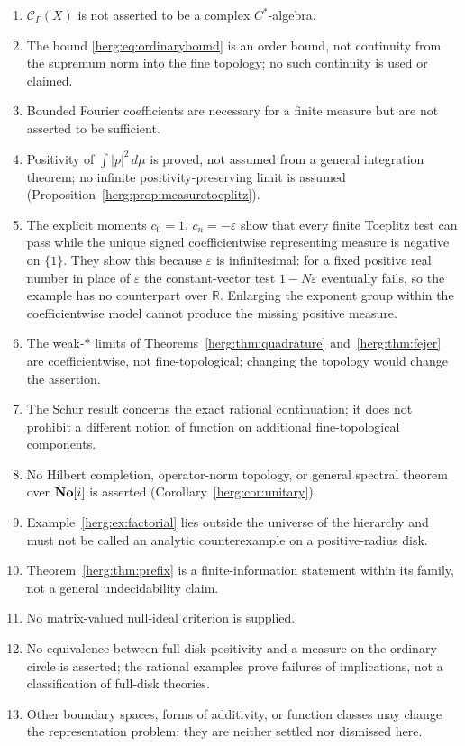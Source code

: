 \documentclass[11pt,letterpaper]{article}
\theoremstyle{definition}
\newcommand{\R}{\mathbb R}\newcommand{\C}{\mathbb C}
\newcommand{\CH}{\mathscr C_\Gamma}
\newcommand{\eps}{\varepsilon}
\newcommand{\dd}{\,d}
\numberwithin{equation}{section}
\begin{document}
\begin{enumerate}[label=\arabic*.,leftmargin=2.2em]
\item $\CH(X)$ is not asserted to be a complex $C^*$-algebra.
\item The bound \eqref{herg:eq:ordinarybound} is an order bound, not continuity from the supremum norm into the fine topology; no such continuity is used or claimed.
\item Bounded Fourier coefficients are necessary for a finite measure but are not asserted to be sufficient.
\item Positivity of $\int|p|^2\dd\mu$ is proved, not assumed from a general integration theorem; no infinite positivity-preserving limit is assumed (Proposition~\ref{herg:prop:measuretoeplitz}).
\item The explicit moments $c_0=1$, $c_n=-\eps$ show that every finite Toeplitz test can pass while the unique signed coefficientwise representing measure is negative on $\{1\}$. They show this because $\eps$ is infinitesimal: for a fixed positive real number in place of $\eps$ the constant-vector test $1-N\eps$ eventually fails, so the example has no counterpart over $\R$. Enlarging the exponent group within the coefficientwise model cannot produce the missing positive measure.
\item The weak-* limits of Theorems~\ref{herg:thm:quadrature} and~\ref{herg:thm:fejer} are coefficientwise, not fine-topological; changing the topology would change the assertion.
\item The Schur result concerns the exact rational continuation; it does not prohibit a different notion of function on additional fine-topological components.
\item No Hilbert completion, operator-norm topology, or general spectral theorem over $\mathbf{No}[i]$ is asserted (Corollary~\ref{herg:cor:unitary}).
\item Example~\ref{herg:ex:factorial} lies outside the universe of the hierarchy and must not be called an analytic counterexample on a positive-radius disk.
\item Theorem~\ref{herg:thm:prefix} is a finite-information statement within its family, not a general undecidability claim.
\item No matrix-valued null-ideal criterion is supplied.
\item No equivalence between full-disk positivity and a measure on the ordinary circle is asserted; the rational examples prove failures of implications, not a classification of full-disk theories.
\item Other boundary spaces, forms of additivity, or function classes may change the representation problem; they are neither settled nor dismissed here.

\end{enumerate}
\end{document}
